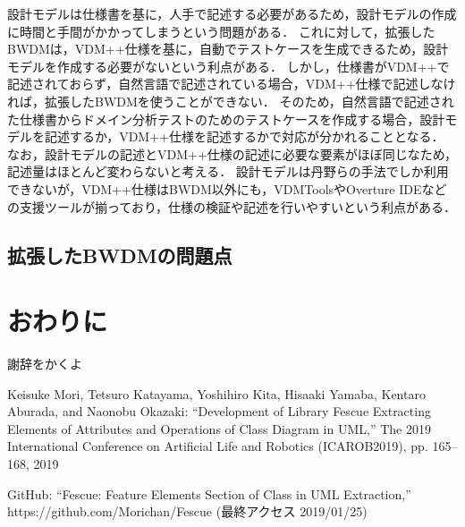 \documentclass[uplatex, report, a4j, 10pt]{jsbook}
\newcommand{\tool}{BWDM}
\begin{document}
設計モデルは仕様書を基に，人手で記述する必要があるため，設計モデルの作成に時間と手間がかかってしまうという問題がある．
これに対して，拡張したBWDMは，VDM++仕様を基に，自動でテストケースを生成できるため，設計モデルを作成する必要がないという利点がある．
しかし，仕様書がVDM++で記述されておらず，自然言語で記述されている場合，VDM++仕様で記述しなければ，拡張したBWDMを使うことができない．
そのため，自然言語で記述された仕様書からドメイン分析テストのためのテストケースを作成する場合，設計モデルを記述するか，VDM++仕様を記述するかで対応が分かれることとなる．
なお，設計モデルの記述とVDM++仕様の記述に必要な要素がほぼ同じなため，記述量はほとんど変わらないと考える．
設計モデルは丹野らの手法でしか利用できないが，VDM++仕様はBWDM以外にも，VDMTools\cite{vdmtools}やOverture IDE\cite{overture}などの支援ツールが揃っており，仕様の検証や記述を行いやすいという利点がある．


\section{拡張した\tool{}の問題点}

\chapter{おわりに} \label{cha:Conclusion}

%
\acknowledgment{}

謝辞をかくよ


%
\begin{thebibliography}{99}
   Keisuke Mori, Tetsuro Katayama, Yoshihiro Kita, Hisaaki Yamaba, Kentaro Aburada, and Naonobu Okazaki: ``Development of Library Fescue Extracting Elements of Attributes and Operations of Class Diagram in UML,'' The 2019 International Conference on Artificial Life and Robotics (ICAROB2019), pp. 165--168, 2019

   GitHub: ``Fescue: Feature Elements Section of Class in UML Extraction,'' https://github.com/Morichan/Fescue (最終アクセス 2019/01/25)
\end{thebibliography}

%
\end{document}
